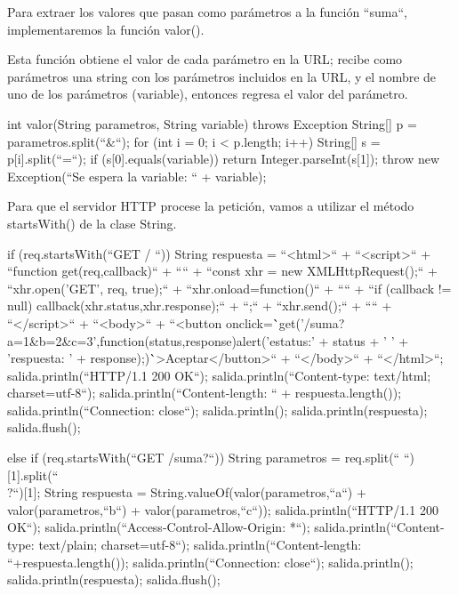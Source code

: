 \documentclass[11pt,a4paper,oneside]{book}
\begin{document}
Para extraer los valores que pasan como parámetros a la función ``suma``, implementaremos la función valor().

Esta función obtiene el valor de cada parámetro en la URL; recibe como parámetros una string con los parámetros incluidos en la URL, y el nombre de uno de los parámetros (variable), entonces regresa el valor del parámetro.

\begin{SourceCode}
int valor(String parametros, String variable) throws Exception
{
  String[] p = parametros.split(``&``);
  for (int i = 0; i < p.length; i++)
  {
    String[] s = p[i].split(``=``);
    if (s[0].equals(variable))
      return Integer.parseInt(s[1]);
  }
  throw new Exception(``Se espera la variable: `` + variable);
}
\end{SourceCode}

Para que el servidor HTTP procese la petición, vamos a utilizar el método startsWith() de la clase String.

\begin{SourceCode}
if (req.startsWith(``GET / ``))
{
  String respuesta =
    ``<html>`` +
    ``<script>`` +
    ``function get(req,callback)`` +
    ``{`` +
    ``const xhr = new XMLHttpRequest();`` +
    ``xhr.open('GET', req, true);`` +
    ``xhr.onload=function()`` +
    ``{`` +
    ``if (callback != null) callback(xhr.status,xhr.response);`` +
    ``};`` +
    ``xhr.send();`` +
    ``}`` +
    ``</script>`` +
    ``<body>`` +
    ``<button onclick=\``get('/suma?a=1&b=2&c=3',function(status,response){alert('estatus:' + status + ' ' + 'respuesta: ' + response);})\``>Aceptar</button>`` +
    ``</body>`` +
    ``</html>``;
  salida.println(``HTTP/1.1 200 OK``);
  salida.println(``Content-type: text/html; charset=utf-8``);
  salida.println(``Content-length: `` + respuesta.length());
  salida.println(``Connection: close``);
  salida.println();
  salida.println(respuesta);
  salida.flush();
}
\end{SourceCode}

\begin{SourceCode}
else
if (req.startsWith(``GET /suma?``))
{
  String parametros = req.split(`` ``)[1].split(``\\?``)[1];
  String respuesta = String.valueOf(valor(parametros,``a``) + valor(parametros,``b``) +
                                                               valor(parametros,``c``));
  salida.println(``HTTP/1.1 200 OK``);
  salida.println(``Access-Control-Allow-Origin: *``);
  salida.println(``Content-type: text/plain; charset=utf-8``);
  salida.println(``Content-length: ``+respuesta.length());
  salida.println(``Connection: close``);
  salida.println();
  salida.println(respuesta);
  salida.flush();
}
 
\end{SourceCode}
\end{document}
